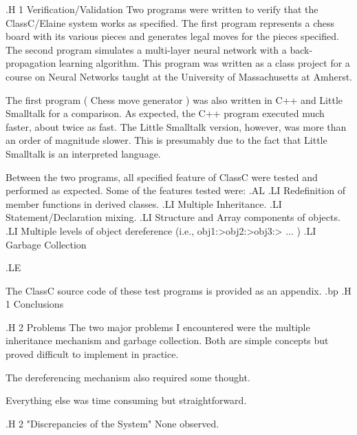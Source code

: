 .H 1 Verification/Validation
Two programs were written to verify that the ClassC/Elaine system
works as specified.  The first program represents a chess board with
its various pieces and generates legal moves for the pieces specified.
The second program simulates a multi-layer neural
network with a back-propagation learning algorithm.  This program was
written as a class project for a course on Neural Networks taught at the
University of Massachusetts at Amherst.

The first program ( Chess move generator ) was also written in C++ and Little
Smalltalk for a comparison.  As expected, the C++ program executed much
faster, about twice as fast.  The Little Smalltalk version, however, was
more than an order of magnitude slower.  This is presumably due to the
fact that Little Smalltalk is an interpreted language.

Between the two
programs, all specified feature of ClassC were tested and performed as
expected.  Some of the features tested were:
.AL
.LI
Redefinition of member functions in derived classes.
.LI
Multiple Inheritance.
.LI
Statement/Declaration mixing.
.LI
Structure and Array components of objects.
.LI
Multiple levels of object dereference (i.e., obj1:>obj2:>obj3:> ... )
.LI
Garbage Collection

.LE

The ClassC
source code of these test programs is provided as an appendix.
.bp
.H 1 Conclusions

.H 2 Problems
The two major problems I encountered were the multiple inheritance mechanism
and garbage collection.  Both are simple concepts but proved difficult
to implement in practice.

The dereferencing mechanism also required some thought.

Everything else was time consuming but straightforward.

.H 2 "Discrepancies of the System"
None observed.

